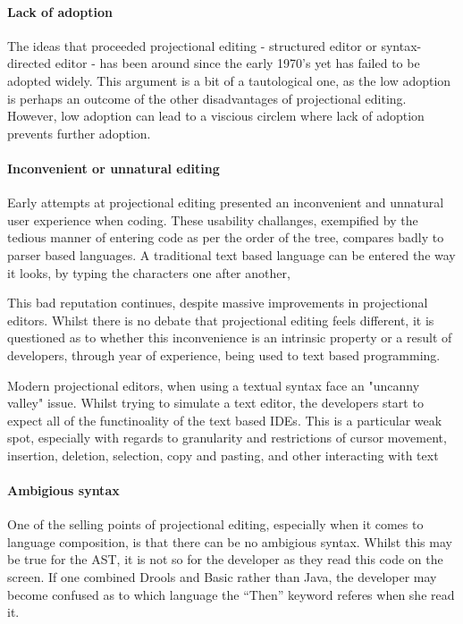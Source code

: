 \paragraph{Lack of adoption}
The ideas that proceeded projectional editing - structured editor or syntax-directed editor - has been around since the early 1970's yet has failed to be adopted widely.
This argument is a bit of a tautological one, as the low adoption is perhaps an outcome of the other disadvantages of projectional editing.
However, low adoption can lead to a viscious circlem where lack of adoption prevents further adoption.

\paragraph{Inconvenient or unnatural editing}
Early attempts at projectional editing presented an inconvenient and unnatural user experience when coding.
These usability challanges, exempified by the tedious manner of entering code as per the order of the tree, compares badly to parser based languages.
A traditional text based language can be entered the way it looks, by typing the characters one after another,

This bad reputation continues, despite massive improvements in projectional editors.
Whilst there is no debate that projectional editing feels different, it is questioned as to whether this inconvenience is an intrinsic property or a result of developers, through year of experience, being used to text based programming. 

Modern projectional editors, when using a textual syntax face an "uncanny valley" issue.
Whilst trying to simulate a text editor, the developers start to expect all of the functinoality of the text based IDEs.
This is a particular weak spot, especially with regards to granularity and restrictions of cursor movement, insertion, deletion, selection, copy and pasting, and other interacting with text

\paragraph{Ambigious syntax}
One of the selling points of projectional editing, especially when it comes to language composition, is that there can be no ambigious syntax.
Whilst this may be true for the AST, it is not so for the developer as they read this code on the screen.
If one combined Drools and Basic rather than Java, the developer may become confused as to which language the ``Then'' keyword referes when she read it.


